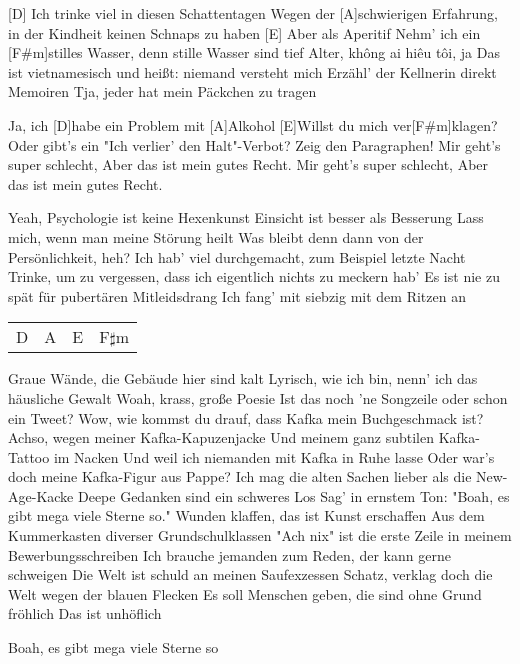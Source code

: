



\begin{guitar}
	
	[D] Ich trinke viel in diesen Schattentagen
	Wegen der [A]schwierigen Erfahrung, in der Kindheit keinen Schnaps zu haben
	[E] Aber als Aperitif
	Nehm' ich ein [F#m]stilles Wasser, denn stille Wasser sind tief
	Alter, không ai hiêu tôi, ja
	Das ist vietnamesisch und heißt: niemand versteht mich
	Erzähl' der Kellnerin direkt Memoiren
	Tja, jeder hat mein Päckchen zu tragen
	
	Ja, ich [D]habe ein Problem mit [A]Alkohol
	[E]Willst du mich ver[F#m]klagen?
	Oder gibt's ein "Ich verlier' den Halt"-Verbot?
	Zeig den Paragraphen!
	Mir geht's super schlecht,
	Aber das ist mein gutes Recht.
	Mir geht's super schlecht,
	Aber das ist mein gutes Recht.
	
	Yeah, Psychologie ist keine Hexenkunst
	Einsicht ist besser als Besserung
	Lass mich, wenn man meine Störung heilt
	Was bleibt denn dann von der Persönlichkeit, heh?
	Ich hab' viel durchgemacht, zum Beispiel letzte Nacht
	Trinke, um zu vergessen, dass ich eigentlich nichts zu meckern hab'
	Es ist nie zu spät für pubertären Mitleidsdrang
	Ich fang' mit siebzig mit dem Ritzen an
	
	 
	
	{\footnotesize\begin{tabular}{l|l|l|l}
			D & A & E & F$\sharp$m
	\end{tabular}}
	
	Graue Wände, die Gebäude hier sind kalt
	Lyrisch, wie ich bin, nenn' ich das häusliche Gewalt
	Woah, krass, große Poesie
	Ist das noch 'ne Songzeile oder schon ein Tweet?
	Wow, wie kommst du drauf, dass Kafka mein Buchgeschmack ist?
	Achso, wegen meiner Kafka-Kapuzenjacke
	Und meinem ganz subtilen Kafka-Tattoo im Nacken
	Und weil ich niemanden mit Kafka in Ruhe lasse
	Oder war's doch meine Kafka-Figur aus Pappe?
	Ich mag die alten Sachen lieber als die New-Age-Kacke
	Deepe Gedanken sind ein schweres Los
	Sag' in ernstem Ton: "Boah, es gibt mega viele Sterne so."
	Wunden klaffen, das ist Kunst erschaffen
	Aus dem Kummerkasten diverser Grundschulklassen
	"Ach nix" ist die erste Zeile in meinem Bewerbungsschreiben
	Ich brauche jemanden zum Reden, der kann gerne schweigen
	Die Welt ist schuld an meinen Saufexzessen
	Schatz, verklag doch die Welt wegen der blauen Flecken
	Es soll Menschen geben, die sind ohne Grund fröhlich
	Das ist unhöflich
	
	 
	
	Boah, es gibt mega viele Sterne so
\end{guitar}